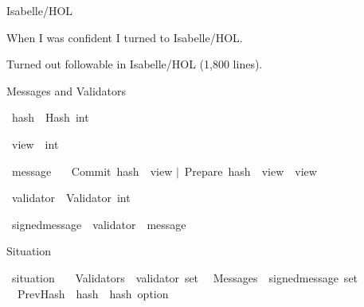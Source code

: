 \documentclass{beamer}
\begin{document}
\begin{frame}{Isabelle/HOL}

When I was confident I turned to Isabelle/HOL.

\vfill

\alert{Turned out followable in Isabelle/HOL (1,800 lines).}
\end{frame}

\renewcommand\isacharbar{$\mid$}

\begin{frame}{Messages and Validators}

\isamarkupfalse%
\ hash\ {\isacharequal}\ Hash\ int%

\isamarkupfalse%
\ view\ {\isacharequal}\ int%

\isamarkupfalse%
\ message\ {\isacharequal}\isanewline
\ \ Commit\ {\isachardoublequoteopen}hash\ {\isacharasterisk}\ view{\isachardoublequoteclose}\isanewline
{\isacharbar}\ Prepare\ {\isachardoublequoteopen}hash\ {\isacharasterisk}\ view\ {\isacharasterisk}\ view{\isachardoublequoteclose}%

\isamarkupfalse%
\ validator\ {\isacharequal}\ Validator\ int%

\isamarkupfalse%
\ signed{\isacharunderscore}message\ {\isacharequal}\ {\isachardoublequoteopen}validator\ {\isacharasterisk}\ message{\isachardoublequoteclose}%
\end{frame}

\begin{frame}{Situation}

\isamarkupfalse%
\ situation\ {\isacharequal}\isanewline
\ \ Validators\ {\isacharcolon}{\isacharcolon}\ {\isachardoublequoteopen}validator\ set{\isachardoublequoteclose}\isanewline
\ \ Messages\ {\isacharcolon}{\isacharcolon}\ {\isachardoublequoteopen}signed{\isacharunderscore}message\ set{\isachardoublequoteclose}\isanewline
\ \ PrevHash\ {\isacharcolon}{\isacharcolon}\ {\isachardoublequoteopen}hash\ {\isasymRightarrow}\ hash\ option{\isachardoublequoteclose}%

\end{frame}


\renewcommand\isacharunderscore{\_}
\end{document}
